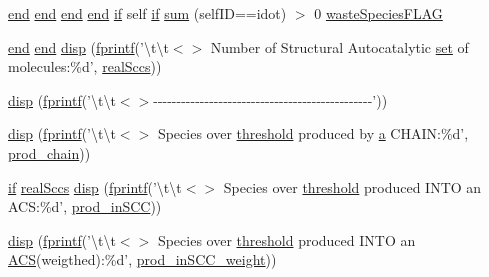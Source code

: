 \begin{DoxyCompactItemize}
\item 
\hyperlink{a00025_afb358f48b1646c750fb9da6c6585be2b}{end} \hyperlink{a00025_afb358f48b1646c750fb9da6c6585be2b}{end} \hyperlink{a00025_afb358f48b1646c750fb9da6c6585be2b}{end} \hyperlink{a00025_afb358f48b1646c750fb9da6c6585be2b}{end} \hyperlink{a00030_a01d55766b8058903dd360b4bda71f9f5}{if} self \hyperlink{a00030_a01d55766b8058903dd360b4bda71f9f5}{if} \hyperlink{a00028_a5330c3728d2e8d052841f1bbf8d33845}{sum} (self\+I\+D==idot) $>$ 0 \hyperlink{a00028_a86a34d23ef767cc82038231f868cea96}{waste\+Species\+F\+L\+A\+G}
\item 
\hyperlink{a00025_afb358f48b1646c750fb9da6c6585be2b}{end} \hyperlink{a00025_afb358f48b1646c750fb9da6c6585be2b}{end} \hyperlink{a00028_a00d6c60332efc3d721036c6f8283fa9b}{disp} (\hyperlink{a00110_aa6dc40efe43a338c9ff278260d95b4d9}{fprintf}('\textbackslash{}t\textbackslash{}t$<$$>$ Number of Structural Autocatalytic \hyperlink{a00028_ab178d77fe9330d344e5b21984e6dfd70}{set} of molecules\+:\%d', \hyperlink{a00028_a135a83e607075aa815c72f1ec0cbbc5a}{real\+Sccs}))
\item 
\hyperlink{a00028_afb873ef090cc25caaad4390f3b7bd082}{disp} (\hyperlink{a00110_aa6dc40efe43a338c9ff278260d95b4d9}{fprintf}('\textbackslash{}t\textbackslash{}t$<$$>$-\/-\/-\/-\/-\/-\/-\/-\/-\/-\/-\/-\/-\/-\/-\/-\/-\/-\/-\/-\/-\/-\/-\/-\/-\/-\/-\/-\/-\/-\/-\/-\/-\/-\/-\/-\/-\/-\/-\/-\/-\/-\/-\/-\/-\/-\/-\/'))
\item 
\hyperlink{a00028_a5fac2e70291daf3041076fa0a3db8d59}{disp} (\hyperlink{a00110_aa6dc40efe43a338c9ff278260d95b4d9}{fprintf}('\textbackslash{}t\textbackslash{}t$<$$>$ Species over \hyperlink{a00036_aa022cbb28f80299d572def08e7a5ccfd}{threshold} produced by \hyperlink{a00035_a2ffdbad9ea59541e59cbd2b938e0770c}{a} C\+H\+A\+I\+N\+:\%d', \hyperlink{a00028_ae0bd6421b7c81047a5234aeeb707efc4}{prod\+\_\+chain}))
\item 
\hyperlink{a00030_a01d55766b8058903dd360b4bda71f9f5}{if} \hyperlink{a00028_a135a83e607075aa815c72f1ec0cbbc5a}{real\+Sccs} \hyperlink{a00028_ab1110569ef2f575182b9d079880d5670}{disp} (\hyperlink{a00110_aa6dc40efe43a338c9ff278260d95b4d9}{fprintf}('\textbackslash{}t\textbackslash{}t$<$$>$ Species over \hyperlink{a00036_aa022cbb28f80299d572def08e7a5ccfd}{threshold} produced I\+N\+T\+O an A\+C\+S\+:\%d', \hyperlink{a00028_a4af96d327ccc28de3433ec07f61e2617}{prod\+\_\+in\+S\+C\+C}))
\item 
\hyperlink{a00028_a164a064f9fd091936d6c363b1cd39961}{disp} (\hyperlink{a00110_aa6dc40efe43a338c9ff278260d95b4d9}{fprintf}('\textbackslash{}t\textbackslash{}t$<$$>$ Species over \hyperlink{a00036_aa022cbb28f80299d572def08e7a5ccfd}{threshold} produced I\+N\+T\+O an \hyperlink{a00028_ad72e1068795c577213481e5db7f3e925}{A\+C\+S}(weigthed)\+:\%d', \hyperlink{a00028_aeb0c708cea53f4ecbc2e1a8fad331f3b}{prod\+\_\+in\+S\+C\+C\+\_\+weight}))
$$
\end{DoxyCompactItemize}
